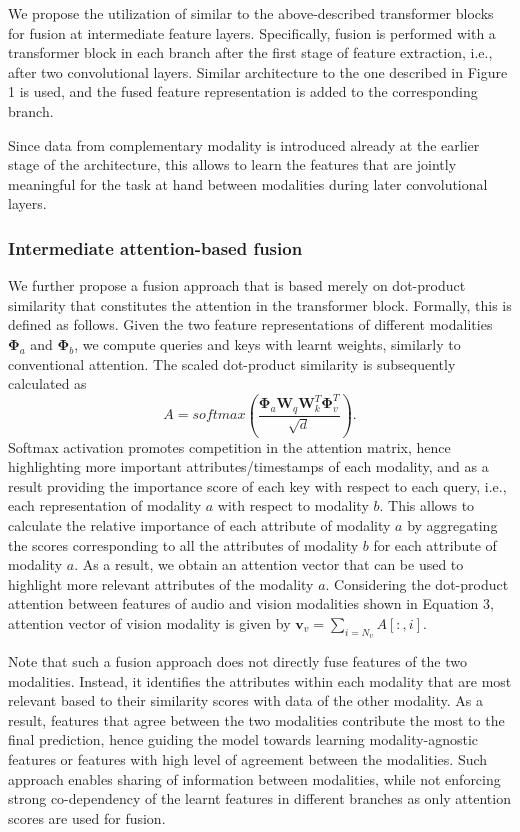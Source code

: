 \documentclass[a4paper,conference]{IEEEtran}
\begin{document}
We propose the utilization of similar to the above-described transformer blocks for fusion at intermediate feature layers. Specifically, fusion is performed with a transformer block in each branch after the first stage of feature extraction, i.e., after two convolutional layers. Similar architecture to the one described in Figure 1 is used, and the fused feature representation is added to the corresponding branch.

Since data from complementary modality is introduced already at the earlier stage of the architecture, this allows to learn the features that are jointly meaningful for the task at hand between modalities during later convolutional layers. 


\subsubsection{Intermediate attention-based fusion}

We further propose a fusion approach that is based merely on dot-product similarity that constitutes the attention in the transformer block. Formally, this is defined as follows. Given the two feature representations of different modalities $\bm{\Phi}_a$ and $\bm{\Phi}_b$, we compute queries and keys with learnt weights, similarly to conventional attention. The scaled dot-product similarity is subsequently calculated as
\begin{equation}
A = softmax\left(\frac{ \bm{\Phi}_a\mathbf{W}_q\mathbf{W}_k^T \bm{\Phi}_v^T}{\sqrt{d}}\right).
\end{equation}
Softmax activation promotes competition in the attention matrix, hence highlighting more important attributes/timestamps of each modality, and as a result providing the importance score of each key with respect to each query, i.e., each representation of modality $a$ with respect to modality $b$. This allows to calculate the relative importance of each attribute of modality $a$ by aggregating the scores corresponding to all the attributes of modality $b$ for each attribute of modality $a$. As a result, we obtain an attention vector that can be used to highlight more relevant attributes of the modality $a$. Considering the dot-product attention between features of audio and vision modalities shown in Equation 3, attention vector of vision modality is given by $\mathbf{v}_v = \sum_{i=N_v}A[:,i].$

Note that such a fusion approach does not directly fuse features of the two modalities. Instead, it identifies the attributes within each modality that are most relevant based to their similarity scores with data of the other modality. As a result, features that agree between the two modalities contribute the most to the final prediction, hence guiding the model towards learning modality-agnostic features or features with high level of agreement between the modalities. Such approach enables sharing of information between modalities, while not enforcing strong co-dependency of the learnt features in different branches as only attention scores are used for fusion. 
\end{document}
